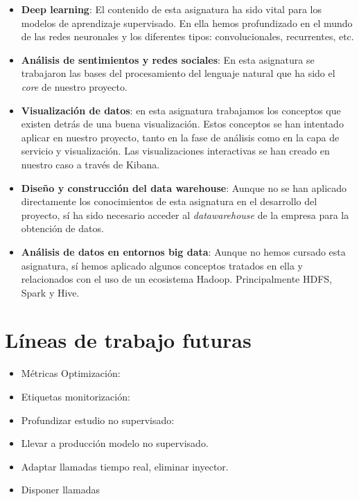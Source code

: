 \begin{itemize}
\item  \textbf{Deep learning}: El contenido de esta asignatura ha sido vital para los modelos de aprendizaje supervisado. En ella hemos profundizado en el mundo de las redes neuronales y los diferentes tipos: convolucionales, recurrentes, etc.

\item  \textbf{Análisis de sentimientos y redes sociales}: En esta asignatura se trabajaron las bases del procesamiento del lenguaje natural que ha sido el \textit{core} de nuestro proyecto.

\item  \textbf{Visualización de datos}: en esta asignatura trabajamos los conceptos que existen detrás de una buena visualización. Estos conceptos se han intentado aplicar en nuestro proyecto, tanto en la fase de análisis como en la capa de servicio y visualización. Las visualizaciones interactivas se han creado en nuestro caso a través de Kibana.

\item  \textbf{Diseño y construcción del data warehouse}: Aunque no se han aplicado directamente los conocimientos de esta asignatura en el desarrollo del proyecto, sí ha sido necesario acceder al \textit{datawarehouse} de la empresa para la obtención de datos.


\item \textbf{Análisis de datos en entornos big data}: Aunque no hemos cursado esta asignatura, sí hemos aplicado algunos conceptos tratados en ella y relacionados con el uso de un ecosistema Hadoop. Principalmente HDFS, Spark y Hive.


\end{itemize}





\section{Líneas de trabajo futuras}

\begin{itemize}
	\item Métricas Optimización: 
	\item Etiquetas monitorización: 
	\item Profundizar estudio no supervisado: 
	\item Llevar a producción modelo no supervisado. 
	\item Adaptar llamadas tiempo real, eliminar inyector. 
	\item Disponer llamadas 
\end{itemize}

